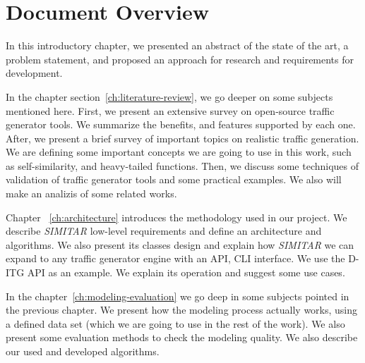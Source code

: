 

\section{Document Overview}


In this introductory chapter, we presented an abstract of the state of the art, a problem statement, and proposed an approach for research and requirements for development.

In the chapter section~\ref{ch:literature-review}, we go deeper on some subjects mentioned here. First, we present an extensive survey on open-source traffic generator tools. We summarize the benefits, and features supported by each one. After, we present a brief survey of important topics on realistic traffic generation. We are defining some important concepts we are going to use in this work, such as self-similarity, and heavy-tailed functions. Then, we discuss some techniques of validation of traffic generator tools and some practical examples. We also will make an analizis of some related works. 

Chapter ~\ref{ch:architecture} introduces the methodology used in our project. We describe \textit{SIMITAR} low-level requirements and define an architecture and algorithms.  We also present its classes design and explain how \textit{SIMITAR} we can expand to any traffic generator engine with an API, CLI interface. We use the D-ITG API as an example. We explain its operation and suggest some use cases.

In the chapter~\ref{ch:modeling-evaluation} we go deep in some subjects pointed in the previous chapter. We present how the modeling process actually works, using a defined data set (which we are going to use in the rest of the work). We also present some evaluation methods to check the modeling quality. We also describe our used and developed algorithms.

